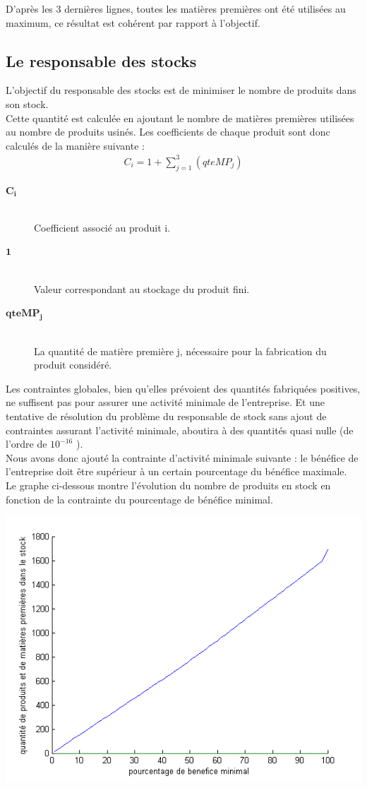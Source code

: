 \documentclass[12pt]{article}
\begin{document}
D'après les 3 dernières lignes, toutes les matières premières ont été utilisées au maximum, ce résultat est cohérent par rapport à l'objectif.
\subsection{Le responsable des stocks}
L'objectif du responsable des stocks est de minimiser le nombre de produits dans son stock. \\
Cette quantité est calculée en ajoutant le nombre de matières premières utilisées au nombre de produits usinés. Les coefficients de chaque produit sont donc calculés de la manière suivante : 
\begin{align*} C_{i} = 1 +  \sum_{j=1}^{3}(qteMP_{j}) 
\end{align*}
\begin{description}
\item[$\mathbf{C_{i}}$]\hfill\\Coefficient associé au produit i.
\item[$\mathbf{1}$]\hfill\\ Valeur correspondant au stockage du produit fini.
\item[$\mathbf{qteMP_{j}}$]\hfill\\La quantité de matière première j, nécessaire pour la fabrication du produit considéré.
\end{description}
Les contraintes globales, bien qu'elles prévoient des quantités fabriquées positives, ne suffisent pas pour assurer une activité minimale de l'entreprise. Et une tentative de résolution du problème du responsable de stock sans ajout de contraintes assurant l'activité minimale, aboutira à des quantités quasi nulle (de l'ordre de $ 10 ^{-16}$ ).\\
Nous avons donc ajouté la contrainte d'activité minimale suivante : le bénéfice de l'entreprise doit être supérieur à un certain pourcentage du bénéfice maximale.\\
Le graphe ci-dessous montre l'évolution du nombre de produits en stock en fonction de la contrainte du pourcentage de bénéfice minimal.  
\begin{center}
\includegraphics[scale=0.7]{plots_partie1/plot_stock.png}
\end{center}
\end{document}
